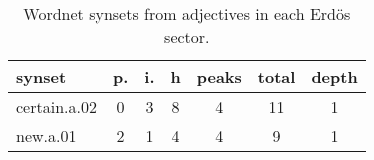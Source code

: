 \begin{table}[h!]
\begin{center}
\begin{tabular}{| l || c | c | c || c | c | c |}\hline
{\bf synset} & {\bf p.} & {\bf i.} & {\bf h} & {\bf peaks} & {\bf total} & {\bf depth} \\\hline\hline
certain.a.02 & 0  & 3  & 8  & 4  & 11  & 1 \\
new.a.01 & 2  & 1  & 4  & 4  & 9  & 1 \\\hline
\end{tabular}
\caption{Wordnet synsets from adjectives in each Erd\"os sector.}
\end{center}
\end{table}